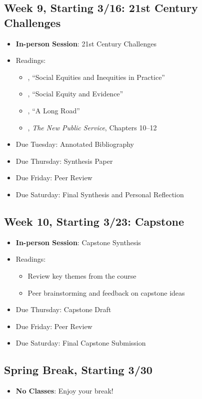 \documentclass[12pt, letterpaper]{article}
\begin{document}
\subsection*{Week 9, Starting 3/16: 21st Century Challenges}
\begin{itemize}
    \item \textbf{In-person Session}: 21st Century Challenges
    \item Readings:
        \begin{itemize}
            \item \citet{maynard-moody2012}, ``Social Equities and Inequities in Practice'' 
            \item \citet{GOODEN2017}, ``Social Equity and Evidence'' 
            \item \citet{mccandless2022}, ``A Long Road''
            \item \citet{Denhardt2015}, \emph{The New Public Service}, Chapters 10--12 
        \end{itemize}
    \item Due Tuesday: Annotated Bibliography
    \item Due Thursday: Synthesis Paper
    \item Due Friday: Peer Review
    \item Due Saturday: Final Synthesis and Personal Reflection
\end{itemize}

\subsection*{Week 10, Starting 3/23: Capstone}
\begin{itemize}
    \item \textbf{In-person Session}: Capstone Synthesis
    \item Readings:
        \begin{itemize}
            \item Review key themes from the course
            \item Peer brainstorming and feedback on capstone ideas
        \end{itemize}
    \item Due Thursday: Capstone Draft
    \item Due Friday: Peer Review
    \item Due Saturday: Final Capstone Submission
\end{itemize}

\subsection*{Spring Break, Starting 3/30}
\begin{itemize}
    \item \textbf{No Classes}: Enjoy your break!
\end{itemize}
\end{document}
